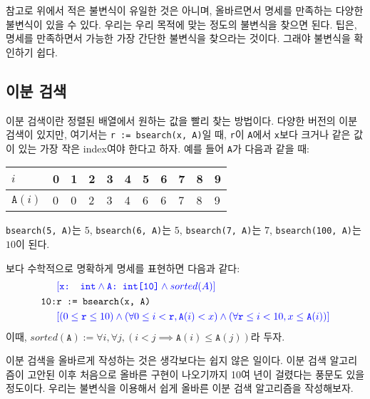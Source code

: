 \documentclass{oblivoir}
\theoremstyle{definition}
\newcommand{\inv}[1]{\textcolor{blue}{\ensuremath{[{#1}]}}}
\begin{document}
참고로 위에서 적은 불변식이 유일한 것은 아니며, 올바르면서 명세를
만족하는 다양한 불변식이 있을 수 있다.  우리는 우리 목적에 맞는 정도의
불변식을 찾으면 된다.  팁은, 명세를 만족하면서 가능한 가장 간단한
불변식을 찾으라는 것이다.  그래야 불변식을 확인하기 쉽다.

\subsection{이분 검색}

이분 검색이란 정렬된 배열에서 원하는 값을 빨리 찾는 방법이다.  다양한
버전의 이분 검색이 있지만, 여기서는 \texttt{r := bsearch(x, A)}일 때,
\texttt{r}이 \texttt{A}에서 \texttt{x}보다 크거나 같은 값이 있는 가장
작은 index여야 한다고 하자.  예를 들어 \texttt{A}가 다음과 같을 때:
\begin{center}
\begin{tabular}{|l|l|l|l|l|l|l|l|l|l|l|}
\hline
$i$ & 0 & 1 & 2 & 3 & 4 & 5 & 6 & 7 & 8 & 9\\
\hline
$\texttt{A}(i)$ & 0 & 0 & 2 & 3 & 4 & 6 & 6 & 7 & 8 & 9\\
\hline
\end{tabular}
\end{center}
\noindent \texttt{bsearch(5, A)}는 $5$, \texttt{bsearch(6, A)}는 $5$,
\texttt{bsearch(7, A)}는 $7$, \texttt{bsearch(100, A)}는 $10$이 된다.

보다 수학적으로 명확하게 명세를 표현하면 다음과 같다:
\begin{align*}
  & \inv{\texttt{x: int} \land \texttt{A: int[10]} \land sorted(A)} \\
  \texttt{10:}& \texttt{r := bsearch(x, A)} \\
  & \inv{(0 \leq \texttt{r} \leq 10) \land (\forall 0\leq i<\texttt{r}, \texttt{A}(i)<x) \land (\forall \texttt{r}\leq i<10, x\leq\texttt{A}(i))}
\end{align*}
이때, $sorted(\texttt{A}) := \forall i, \forall j, (i<j \implies
\texttt{A}(i)\leq \texttt{A}(j))$라 두자.

이분 검색을 올바르게 작성하는 것은 생각보다는 쉽지 않은 일이다.  이분
검색 알고리즘이 고안된 이후 처음으로 올바른 구현이 나오기까지 10여 년이
걸렸다는 풍문도 있을 정도이다.  우리는 불변식을 이용해서 쉽게 올바른
이분 검색 알고리즘을 작성해보자.
\end{document}
